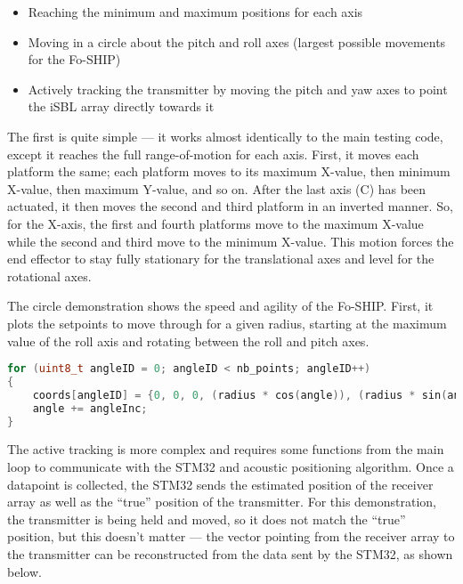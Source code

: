 \documentclass[11pt]{ucthesisCP}
\begin{document}
\begin{itemize}[noitemsep,topsep=0pt]
	\item Reaching the minimum and maximum positions for each axis
	\item Moving in a circle about the pitch and roll axes (largest possible movements for the Fo-SHIP)
	\item Actively tracking the transmitter by moving the pitch and yaw axes to point the iSBL array directly towards it
\end{itemize}

The first is quite simple --- it works almost identically to the main testing code, except it reaches the full range-of-motion for each axis. First, it moves each platform the same; each platform moves to its maximum X-value, then minimum X-value, then maximum Y-value, and so on. After the last axis (C) has been actuated, it then moves the second and third platform in an inverted manner. So, for the X-axis, the first and fourth platforms move to the maximum X-value while the second and third move to the minimum X-value. This motion forces the end effector to stay fully stationary for the translational axes and level for the rotational axes.

The circle demonstration shows the speed and agility of the Fo-SHIP. First, it plots the setpoints to move through for a given radius, starting at the maximum value of the roll axis and rotating between the roll and pitch axes.

\begin{lstlisting}[language=C++]
for (uint8_t angleID = 0; angleID < nb_points; angleID++)
{
	coords[angleID] = {0, 0, 0, (radius * cos(angle)), (radius * sin(angle)), 0};
	angle += angleInc;
}
\end{lstlisting}

The active tracking is more complex and requires some functions from the main loop to communicate with the STM32 and acoustic positioning algorithm. Once a datapoint is collected, the STM32 sends the estimated position of the receiver array as well as the “true” position of the transmitter. For this demonstration, the transmitter is being held and moved, so it does not match the “true” position, but this doesn’t matter --- the vector pointing from the receiver array to the transmitter can be reconstructed from the data sent by the STM32, as shown below. 
\end{document}
